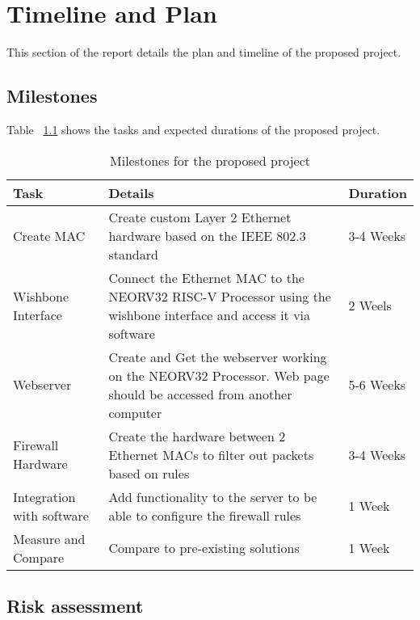 
\chapter[Abbreviated title]{Timeline and Plan}
\label{Chap:label}	%
\pagestyle{headings}



This section of the report details the plan and timeline of the proposed project.


\section{Milestones}
\label{Sec:label}	%

Table ~\ref{table:milestones} shows the tasks and expected durations of the proposed project.
  

\begin{table}[hbt!]
\centering%
    \begin{tabularx}{\textwidth}{ lXl }
        \hline
        Task                            & Details & Duration  \\ \hline
        Create MAC                      &  Create custom Layer 2 Ethernet hardware based on the IEEE 802.3 standard      & 3-4 Weeks \\
        Wishbone Interface              &  Connect the Ethernet MAC to the NEORV32 RISC-V Processor using the wishbone interface and access it via software       & 2 Weels   \\
        Webserver                       &  Create and Get the webserver working on the NEORV32 Processor. Web page should be accessed from another computer       & 5-6 Weeks \\ 
        Firewall Hardware               &  Create the hardware between 2 Ethernet MACs to filter out packets based on rules      & 3-4 Weeks \\ 
        Integration with software       &  Add functionality to the server to be able to configure the firewall rules       & 1 Week \\ 
        Measure and Compare             &  Compare to pre-existing solutions       & 1 Week \\ 
        \hline
        \end{tabularx}
\caption{ Milestones for the proposed project}\label{table:milestones}
\end{table}
 

\section{Risk assessment}
